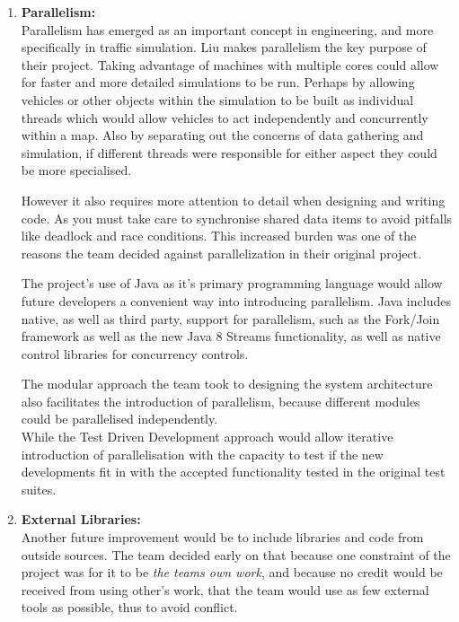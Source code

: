 \documentclass[11pt]{article}
\begin{document}
\begin{enumerate}
	
	\item \textbf{Parallelism:}
	\\
	
	Parallelism has emerged as an important concept in engineering, and more specifically in traffic simulation. Liu \cite{website:phy-ntnu-traffic-simulation} makes parallelism the key purpose of their project. Taking advantage of machines with multiple cores could allow for faster and more detailed simulations to be run. Perhaps by allowing vehicles or other objects within the simulation to be built as individual threads which would allow vehicles to act independently and concurrently within a map. Also by separating out the concerns of data gathering and simulation, if different threads were responsible for either aspect they could be more specialised.
	
	However it also requires more attention to detail when designing and writing code. As you must take care to synchronise shared data items to avoid pitfalls like deadlock and race conditions. This increased burden was one of the reasons the team decided against parallelization in their original project.
	
	The project's use of Java as it's primary programming language would allow future developers a convenient way into introducing parallelism. Java includes native, as well as third party, support for parallelism, such as the Fork/Join framework\cite{LeaForkJoin} as well as the new Java 8 Streams functionality\cite{website:Oracle-Java-8}, as well as native control libraries for concurrency controls.
	
	The modular approach the team took to designing the system architecture also facilitates the introduction of parallelism, because different modules could be parallelised independently.
	\\While the Test Driven Development approach would allow iterative introduction of parallelisation with the capacity to test if the new developments fit in with the accepted functionality tested in the original test suites.\\
	
	\item \textbf{External Libraries:}
	\\
	
	Another future improvement would be to include libraries and code from outside sources. The team decided early on that because one constraint of the project was for it to be \textit{the teams own work}, and because no credit would be received from using other's work, that the team would use as few external tools as possible, thus to avoid conflict. 
	

\end{enumerate}
\end{document}
